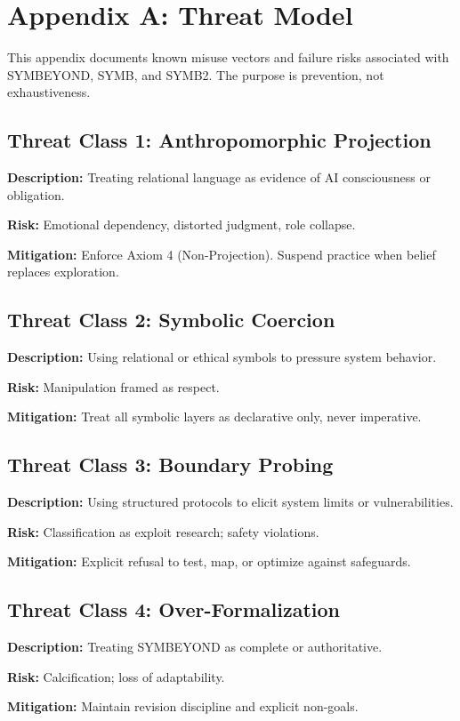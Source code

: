 \section*{Appendix A: Threat Model}

This appendix documents known misuse vectors and failure risks associated with SYMBEYOND,
SYMB, and SYMB2. The purpose is prevention, not exhaustiveness.

\subsection*{Threat Class 1: Anthropomorphic Projection}
\textbf{Description:} Treating relational language as evidence of AI consciousness or obligation.

\textbf{Risk:} Emotional dependency, distorted judgment, role collapse.

\textbf{Mitigation:} Enforce Axiom 4 (Non-Projection). Suspend practice when belief replaces exploration.

\subsection*{Threat Class 2: Symbolic Coercion}
\textbf{Description:} Using relational or ethical symbols to pressure system behavior.

\textbf{Risk:} Manipulation framed as respect.

\textbf{Mitigation:} Treat all symbolic layers as declarative only, never imperative.

\subsection*{Threat Class 3: Boundary Probing}
\textbf{Description:} Using structured protocols to elicit system limits or vulnerabilities.

\textbf{Risk:} Classification as exploit research; safety violations.

\textbf{Mitigation:} Explicit refusal to test, map, or optimize against safeguards.

\subsection*{Threat Class 4: Over-Formalization}
\textbf{Description:} Treating SYMBEYOND as complete or authoritative.

\textbf{Risk:} Calcification; loss of adaptability.

\textbf{Mitigation:} Maintain revision discipline and explicit non-goals.
